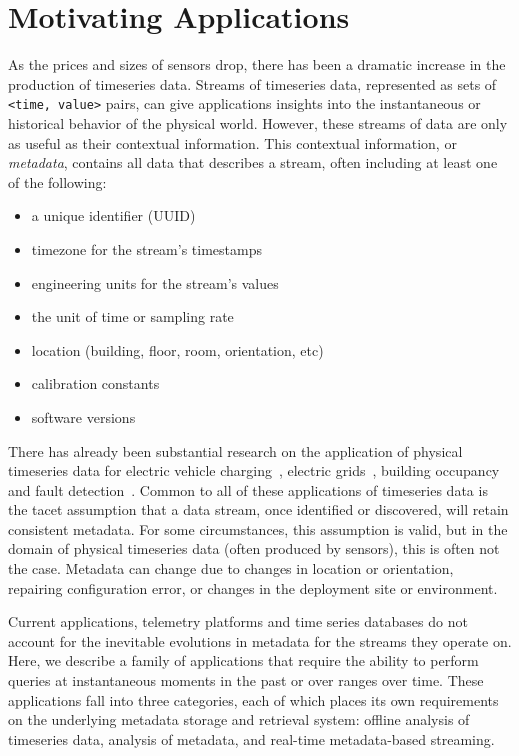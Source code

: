 \section{Motivating Applications}

As the prices and sizes of sensors drop, there has been a dramatic increase in
the production of timeseries data. Streams of timeseries data, represented as
sets of \texttt{<time, value>} pairs, can give applications insights into the
instantaneous or historical behavior of the physical world.  However, these
streams of data are only as useful as their contextual information.  This
contextual information, or \emph{metadata}, contains all data that describes a
stream, often including at least one of the following:

\begin{itemize}
\item a unique identifier (UUID)
\item timezone for the stream's timestamps
\item engineering units for the stream's values
\item the unit of time or sampling rate
\item location (building, floor, room, orientation, etc)
\item calibration constants
\item software versions
\end{itemize}

There has already been substantial research on the application of physical
timeseries data for electric vehicle charging~\cite{sortomme2011optimal},
electric grids~\cite{carreras2004evidence}, building
occupancy~\cite{richardson2008high} and fault
detection~\cite{fontugne2013strip}. Common to all of these applications of
timeseries data is the tacet assumption that a data stream, once identified or
discovered, will retain consistent metadata. For some circumstances, this
assumption is valid, but in the domain of physical timeseries data (often
produced by sensors), this is often not the case. Metadata can change due to
changes in location or orientation, repairing configuration error, or changes
in the deployment site or environment.

Current applications, telemetry platforms and time series databases do not
account for the inevitable evolutions in metadata for the streams they operate
on. Here, we describe a family of applications that require the ability to
perform queries at instantaneous moments in the past or over ranges over time.
These applications fall into three categories, each of which places its
own requirements on the underlying metadata storage and retrieval system:
offline analysis of timeseries data, analysis of metadata, and real-time
metadata-based streaming.

